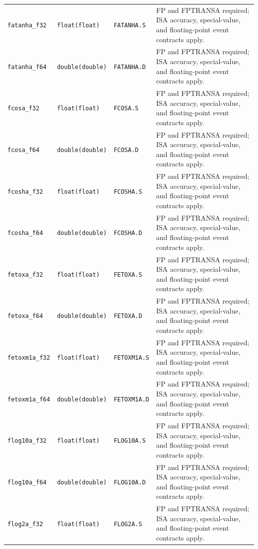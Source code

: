 \begin{longtable}{@{}p{1.25in}p{1.3in}p{0.85in}p{2.2in}@{}}
\texttt{fatanha\_f32} & \texttt{float(float)} & \texttt{FATANHA.S} & FP and FPTRANSA required; ISA accuracy, special-value, and floating-point event contracts apply.\\
\texttt{fatanha\_f64} & \texttt{double(double)} & \texttt{FATANHA.D} & FP and FPTRANSA required; ISA accuracy, special-value, and floating-point event contracts apply.\\
\texttt{fcosa\_f32} & \texttt{float(float)} & \texttt{FCOSA.S} & FP and FPTRANSA required; ISA accuracy, special-value, and floating-point event contracts apply.\\
\texttt{fcosa\_f64} & \texttt{double(double)} & \texttt{FCOSA.D} & FP and FPTRANSA required; ISA accuracy, special-value, and floating-point event contracts apply.\\
\texttt{fcosha\_f32} & \texttt{float(float)} & \texttt{FCOSHA.S} & FP and FPTRANSA required; ISA accuracy, special-value, and floating-point event contracts apply.\\
\texttt{fcosha\_f64} & \texttt{double(double)} & \texttt{FCOSHA.D} & FP and FPTRANSA required; ISA accuracy, special-value, and floating-point event contracts apply.\\
\texttt{fetoxa\_f32} & \texttt{float(float)} & \texttt{FETOXA.S} & FP and FPTRANSA required; ISA accuracy, special-value, and floating-point event contracts apply.\\
\texttt{fetoxa\_f64} & \texttt{double(double)} & \texttt{FETOXA.D} & FP and FPTRANSA required; ISA accuracy, special-value, and floating-point event contracts apply.\\
\texttt{fetoxm1a\_f32} & \texttt{float(float)} & \texttt{FETOXM1A.S} & FP and FPTRANSA required; ISA accuracy, special-value, and floating-point event contracts apply.\\
\texttt{fetoxm1a\_f64} & \texttt{double(double)} & \texttt{FETOXM1A.D} & FP and FPTRANSA required; ISA accuracy, special-value, and floating-point event contracts apply.\\
\texttt{flog10a\_f32} & \texttt{float(float)} & \texttt{FLOG10A.S} & FP and FPTRANSA required; ISA accuracy, special-value, and floating-point event contracts apply.\\
\texttt{flog10a\_f64} & \texttt{double(double)} & \texttt{FLOG10A.D} & FP and FPTRANSA required; ISA accuracy, special-value, and floating-point event contracts apply.\\
\texttt{flog2a\_f32} & \texttt{float(float)} & \texttt{FLOG2A.S} & FP and FPTRANSA required; ISA accuracy, special-value, and floating-point event contracts apply.\\

\end{longtable}
